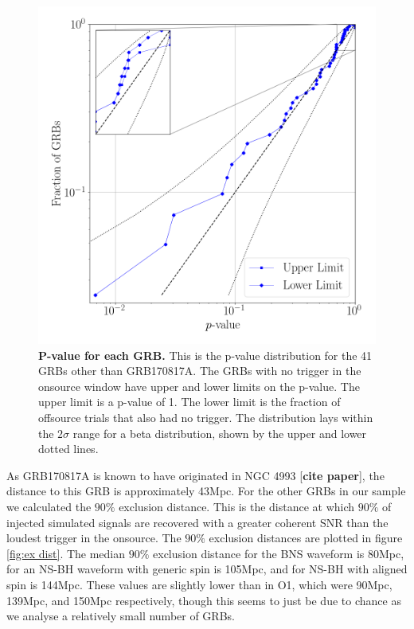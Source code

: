 \documentclass[11pt]{cuthesis}
\begin{document}
\begin{figure}
\begin{center}
\includegraphics[width=0.8\linewidth]{pygrb_pvalue.png}
\end{center}
\caption{\textbf{P-value for each GRB.} This is the p-value distribution for the 41 GRBs other than GRB170817A. The GRBs with no trigger in the onsource window have upper and lower limits on the p-value. The upper limit is a p-value of 1. The lower limit is the fraction of offsource trials that also had no trigger. The distribution lays within the $2\sigma$ range for a beta distribution, shown by the upper and lower dotted lines.  }
\label{fig:pvalue}
\end{figure}

As GRB170817A is known to have originated in NGC 4993 [\textbf{cite paper}], the distance to this GRB is approximately 43Mpc. For the other GRBs in our sample we calculated the $90\%$ exclusion distance. This is the distance at which $90\%$ of injected simulated signals are recovered with a greater coherent SNR than the loudest trigger in the onsource. The $90\%$ exclusion distances are plotted in figure \ref{fig:ex dist}. The median $90\%$ exclusion distance for the BNS waveform is 80Mpc, for an NS-BH waveform with generic spin is 105Mpc, and for NS-BH with aligned spin is 144Mpc. These values are slightly lower than in O1, which were 90Mpc, 139Mpc, and 150Mpc respectively, though this seems to just be due to chance as we analyse a relatively small number of GRBs. 
\end{document}
